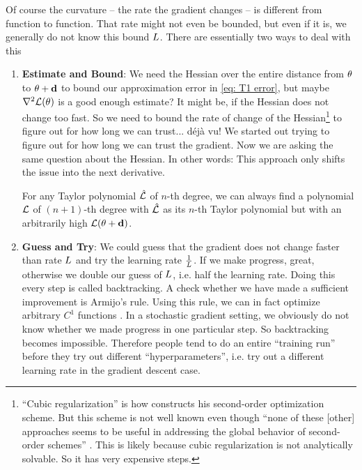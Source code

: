 Of course the curvature -- the rate the gradient changes -- is different from
function to function. That rate might not even be bounded, but even if it is,
we generally do not know this bound \(L\). There are essentially two ways
to deal with this
\begin{enumerate}
	\item \textbf{Estimate and Bound}: We need the Hessian over the entire distance
	from \(\theta\) to \(\theta + \mathbf{d}\) to bound our approximation error in
	\eqref{eq: T1 error}, but maybe \(\nabla^2\mathcal{L}(\theta)\) is a good enough
	estimate? It might be, if the Hessian does not change too fast. So we need
	to bound the rate of change of the Hessian\footnote{
		``Cubic regularization'' is how \textcite[Section
		4.1]{nesterovLecturesConvexOptimization2018} constructs his second-order
		optimization scheme. But this scheme is not well known even though ``none
		of these [other] approaches seems to be useful in addressing the global
		behavior of second-order schemes'' \parencite[p.
		242]{nesterovLecturesConvexOptimization2018}. This is likely because cubic
		regularization is not analytically solvable. So it has very expensive
		steps.
	} to figure out for how long we can
	trust... déjà vu! We started out trying to figure out for how long we
	can trust the gradient. Now we are asking the same question about the
	Hessian. In other words: This approach only shifts the issue into the next
	derivative.

	For any Taylor polynomial \(\hat{\mathcal{L}}\) of \(n\)-th degree, we can always
	find a polynomial \(\mathcal{L}\) of \((n+1)\)-th degree with \(\hat{\mathcal{L}}\) as
	its \(n\)-th Taylor polynomial but with an arbitrarily high \(\mathcal{L}(\theta +
	\mathbf{d})\).

	\item \textbf{Guess and Try}: We could guess that the gradient does not
	change faster than rate \(L\) and try the learning rate \(\frac1{L}\).
	If we make progress, great, otherwise we double our guess of \(L\),
	i.e. half the learning rate. Doing this every step is called backtracking. A
	check whether we have made a sufficient improvement is Armijo's rule. Using
	this rule, we can in fact optimize arbitrary \(C^1\) functions
	\parencite{truongBacktrackingGradientDescent2019}. In a stochastic gradient
	setting, we obviously do not know whether we made progress in one particular
	step. So backtracking becomes impossible. Therefore people tend to do an
	entire ``training run'' before they try out different ``hyperparameters'',
	i.e.  try out a different learning rate in the gradient descent case.
\end{enumerate}

